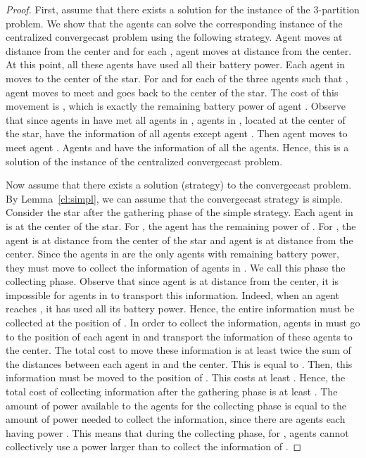 \documentclass{article}
\newcommand\strat{\mbox{strategy}\xspace}
\newcommand\convergecast{convergecast\xspace}
\newcommand\ccast{convergecast\xspace}
\newcommand\cccast{centralized convergecast\xspace}
\begin{document}
\begin{proof}
First, assume that there exists a solution  for the instance of the 3-partition problem. We show that the agents can solve the corresponding instance of the centralized {\convergecast} problem using the following {\strat}. Agent  moves at distance  from the center and for each , agent  moves at distance  from the center. At this point, all these agents have used all their battery power. Each agent in  moves to the center of the star. For  and for each of the three agents  such that , agent  moves to meet  and goes back to the center of the star. The cost of this movement is , which is exactly the remaining battery power of agent . Observe that since agents in  have met all agents in , agents in , located at the center of the star, have the information of all agents except agent . Then agent  moves to meet agent . 
Agents  and  have the information of all the agents. Hence, this is a solution of the instance of the {\cccast} problem.

\medskip

Now assume that there exists a solution (strategy) to the convergecast problem.
By Lemma~\ref{cl:simpl}, we can assume that the {\ccast} {\strat} is simple. Consider the star  after the gathering phase of the simple {\strat}. Each agent in  is at the center of the star. For , the agent  has the remaining power of . For , the agent  is at distance  from the center of the star and agent  is at distance  from the center. Since the agents in  are the only agents with remaining battery power, they must move to collect the information of agents in . We call this phase the collecting phase. Observe that since agent  is at distance  from the center, it is impossible for agents in  to transport this information. Indeed, when an agent reaches , it has used all its battery power. Hence, the entire information must be collected at the position of . In order to collect the information, agents in  must go to the position of each agent in  and transport the information of these agents to the center. The total cost to move these information is at least twice the sum of the distances between each agent in  and the center. This is equal to . Then, this information must be moved to the position of . This costs at least . Hence, the total cost of collecting information after the gathering phase is at least . The amount of power available to the agents for the collecting phase is equal to the amount of power needed to collect the information, since there are  agents each having power . This means that during the collecting phase, for , agents cannot collectively use a power larger than  to collect the information of . 


\end{proof}
\end{document}
